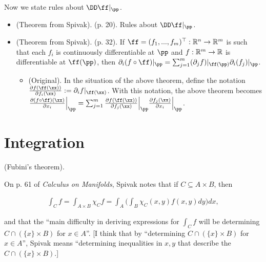 Now we state rules about $\DD \ff|_\pp$.

\begin{itemize}
    \item (Theorem from Spivak). (p. 20). Rules about $\DD \ff|_\pp$.
    \item (Theorem from Spivak). (p. 32). If $\ff = (f_1, ..., f_m)^\top:\R^n \rightarrow \R^m$ is such that each $f_i$ is continuously differentiable at $\pp$ and $f:\mathbb{R}^m \rightarrow \mathbb{R}$ is differentiable at $\ff(\pp)$, then $\pd_i (f \circ \ff)|_\pp = \sum_{j = 1}^m (\pd_j f)|_{\ff(\pp)} \pd_i (f_j)|_\pp$.
    \begin{itemize}
        \item (Original). In the situation of the above theorem, define the notation $\frac{\pd f(\ff(\xx))}{\pd f_i(\xx)} := \pd_i f|_{\ff(\xx)}$. With this notation, the above theorem becomes $\frac{\pd(f \circ \ff)(\xx)}{\pd x_i}\Big|_\pp = \sum_{j = 1}^m \frac{\pd f(\ff(\xx))}{\pd f_j(\xx)} \Big|_\pp \frac{\pd f_j(\xx)}{\pd x_i}\Big|_\pp$.
    \end{itemize}
\end{itemize}

\section*{Integration}

\begin{theorem}
    (Fubini's theorem). 

    On p. 61 of \textit{Calculus on Manifolds}, Spivak notes that if $C \subseteq A \times B$, then

    \begin{align*}
        \int_C f = \int_{A \times B} \chi_C f = \int_A \Big( \int_B \chi_C(x, y) f(x, y) dy \Big) dx,
    \end{align*}

    and that the ``main difficulty in deriving expressions for $\int_C f$ will be determining $C \cap (\{x\} \times B)$ for $x \in A$''. [I think that by ``determining $C \cap (\{x\} \times B)$ for $x \in A$'', Spivak means ``determining inequalities in $x, y$ that describe the $C \cap (\{x\} \times B)$.]
\end{theorem}

